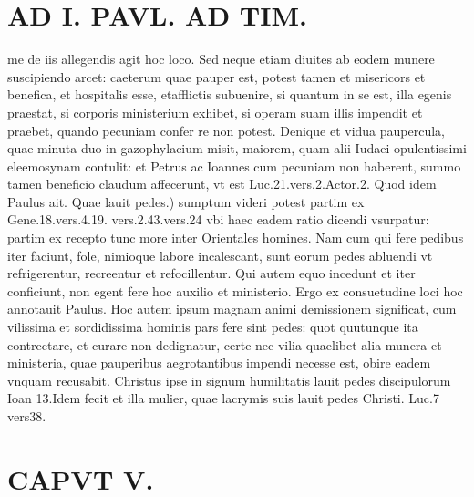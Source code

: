 \documentclass{article}
\begin{document}
\begin{pages}
\section*{AD I. PAVL. AD TIM. }
\marginpar{[ p.A0O ]}\pstart me de iis allegendis agit hoc loco. Sed neque etiam diuites ab eodem munere suscipiendo arcet: caeterum quae pauper est, potest tamen et misericors et benefica, et hospitalis esse, etafflictis subuenire, si quantum in se est, illa egenis praestat, si corporis ministerium exhibet, si operam suam illis impendit et praebet, quando pecuniam confer re non potest. Denique et vidua paupercula, quae minuta duo in gazophylacium misit, maiorem, quam alii Iudaei opulentissimi eleemosynam contulit: et Petrus ac Ioannes cum pecuniam non haberent, summo tamen beneficio claudum affecerunt, vt est Luc.21.vers.2.Actor.2. Quod idem Paulus ait. Quae lauit pedes.) sumptum videri potest partim ex Gene.18.vers.4.19. vers.2.43.vers.24 vbi haec eadem ratio dicendi vsurpatur: partim ex recepto tunc more inter Orientales homines. Nam cum qui fere pedibus iter faciunt, fole, nimioque labore incalescant, sunt eorum pedes abluendi vt refrigerentur, recreentur et refocillentur. Qui autem equo incedunt et iter conficiunt, non egent fere hoc auxilio et ministerio. Ergo ex consuetudine loci hoc annotauit Paulus. Hoc autem ipsum magnam animi demissionem significat, cum vilissima et sordidissima hominis pars fere sint pedes: quot quutunque ita contrectare, et curare non dedignatur, certe nec vilia quaelibet alia munera et ministeria, quae pauperibus aegrotantibus impendi necesse est, obire eadem vnquam recusabit. Christus ipse in signum humilitatis lauit pedes discipulorum Ioan 13.Idem fecit et illa mulier, quae lacrymis suis lauit pedes Christi. Luc.7 vers38.  \pend
\section*{CAPVT  V. }
\marginpar{[ p.281 ]}\pstart {}
{}

\end{pages}
\end{document}
